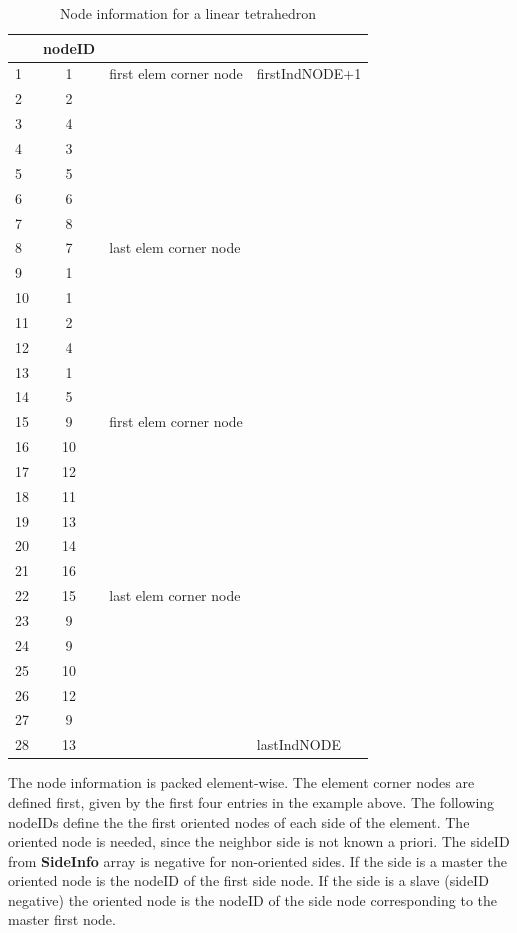 \begin{table}[h!]
\centering
\begin{tabular}{|l|c||l|l|} \hline
  & nodeID & &\\ \hline
1 & 1 &  first elem corner node&  firstIndNODE+1 \\
2 & 2 &  &  \\ 
3 & 4 &  &  \\ 
4 & 3 &  &  \\ 
5 & 5 &  &  \\ 
6 & 6 &  &  \\ 
7 & 8 & &  \\ 
8 & 7 &   last elem corner node  &  \\ \hline
9 & 1 &  &  \\ \hline
10 & 1 &  &  \\ \hline
11 & 2 &  &  \\ \hline
12 & 4 &  &  \\ \hline
13 & 1 &  &  \\ \hline
14 & 5 &  &  \\ \hline
15 & 9 &  first elem corner node &  \\
16 & 10 &  &  \\ 
17 & 12 &  &  \\ 
18 & 11 &  &  \\
19 & 13 &  &  \\ 
20 & 14 &  &  \\
21 & 16 &  &  \\ 
22 & 15 &  last  elem corner node &  \\  \hline
23 & 9 &  &  \\ \hline
24 & 9 &  &  \\ \hline
25 & 10 &  &  \\ \hline
26 & 12 &  &  \\ \hline
27 & 9 &  &  \\ \hline
28 & 13 &  &  lastIndNODE \\ \hline
\end{tabular}
\caption{Node information for a linear tetrahedron}
\end{table}
The node information is packed element-wise. The element corner nodes are defined first, given by the first four entries in the example above. The following nodeIDs define the the first oriented nodes of each side of the element. The oriented node is needed, since the neighbor side is not known a priori. The sideID from \textbf{SideInfo} array is negative for non-oriented sides. If the side is a master the oriented node is the nodeID of the first side node. If the side is a slave (sideID negative) the oriented node is the nodeID of the side node corresponding to the master first node.
\newpage

